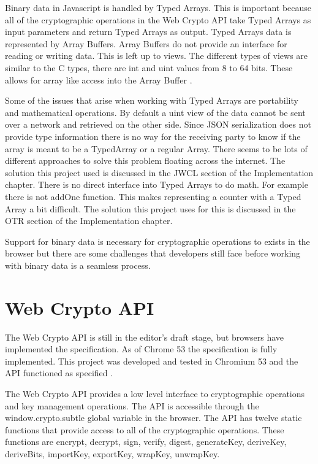 Binary data in Javascript is handled by Typed Arrays. This is important because all of the cryptographic operations in the Web Crypto API take Typed Arrays as input parameters and return Typed Arrays as output. Typed Arrays data is represented by Array Buffers. Array Buffers do not provide an interface for reading or writing data. This is left up to views. The different types of views are similar to the C types, there are int and uint values from 8 to 64 bits. These allows for array like access into the Array Buffer \cite{mdn-typedarrays}.


Some of the issues that arise when working with Typed Arrays are portability and mathematical operations. By default a uint view of the data cannot be sent over a network and retrieved on the other side. Since JSON serialization does not provide type information there is no way for the receiving party to know if the array is meant to be a TypedArray or a regular Array. There seems to be lots of different approaches to solve this problem floating across the internet. The solution this project used is discussed in the JWCL section of the Implementation chapter. There is no direct interface into Typed Arrays to do math. For example there is not addOne function. This makes representing a counter with a Typed Array a bit difficult. The solution this project uses for this is discussed in the OTR section of the Implementation chapter.


Support for binary data is necessary for cryptographic operations to exists in the browser but there are some challenges that developers still face before working with binary data is a seamless process.


\section{Web Crypto API}


The Web Crypto API is still in the editor's draft stage, but browsers have implemented the specification. As of Chrome 53 the specification is fully implemented. This project was developed and tested in Chromium 53 and the API functioned as specified \cite{webcrypto-overview}\cite{webcrypto-chromium}.


The Web Crypto API provides a low level interface to cryptographic operations and key management operations. The API is accessible through the window.crypto.subtle global variable in the browser. The API has twelve static functions that provide access to all of the cryptographic operations. These functions are encrypt, decrypt, sign, verify, digest, generateKey, deriveKey, deriveBits, importKey, exportKey, wrapKey, unwrapKey.


